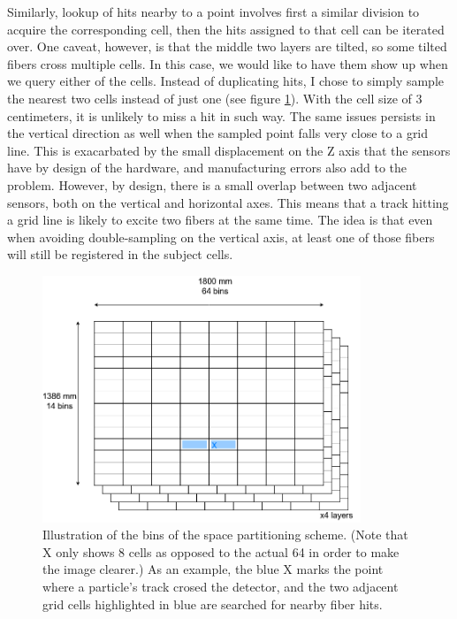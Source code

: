 \documentclass[12pt]{article}
\begin{document}
Similarly, lookup of hits nearby to a point involves first a similar division to acquire the corresponding cell, then the hits assigned to that cell can be iterated over. One caveat, however, is that the middle two layers are tilted, so some tilted fibers cross multiple cells. In this case, we would like to have them show up when we query either of the cells. Instead of duplicating hits, I chose to simply sample the nearest two cells instead of just one (see figure \ref{fig_velout_space_partitioning}). With the cell size of 3 centimeters, it is unlikely to miss a hit in such way. The same issues persists in the vertical direction as well when the sampled point falls very close to a grid line. This is exacarbated by the small displacement on the Z axis that the sensors have by design of the hardware, and manufacturing errors also add to the problem. However, by design, there is a small overlap between two adjacent sensors, both on the vertical and horizontal axes. This means that a track hitting a grid line is likely to excite two fibers at the same time. The idea is that even when avoiding double-sampling on the vertical axis, at least one of those fibers will still be registered in the subject cells.

\begin{figure}[H]
	\begin{center}
		\includegraphics[width=0.85\textwidth]{velout_space_partitioning}
	\end{center}
	\caption{Illustration of the bins of the space partitioning scheme. (Note that X only shows 8 cells as opposed to the actual 64 in order to make the image clearer.) As an example, the blue X marks the point where a particle's track crosed the detector, and the two adjacent grid cells highlighted in blue are searched for nearby fiber hits.}
	\label{fig_velout_space_partitioning}
\end{figure}
\end{document}
